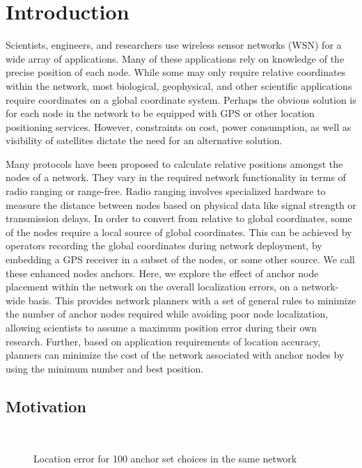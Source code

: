 
\chapter{Introduction}

Scientists, engineers, and researchers use wireless sensor networks (WSN) for a wide array of applications. Many of these applications rely on knowledge of the precise position of each node. While some may only require relative coordinates within the network, most biological, geophysical, and other scientific applications require coordinates on a global coordinate system. Perhaps the obvious solution is for each node in the network to be equipped with GPS or other location positioning services.  However, constraints on cost, power consumption, as well as visibility of satellites dictate the need for an alternative solution.  

Many protocols have been proposed\cite{APS,MDS-MAP,CCA-MAP07} to calculate relative positions amongst the nodes of a network.  They vary in the required network functionality in terms of radio ranging or range-free.  Radio ranging involves specialized hardware to measure the distance between nodes based on physical data like signal strength or transmission delays.  In order to convert from relative to global coordinates, some of the nodes require a local source of global coordinates.  This can be achieved by operators recording the global coordinates during network deployment, by embedding a GPS receiver in a subset of the nodes, or some other source.  We call these enhanced nodes anchors.  Here, we explore the effect of anchor node placement within the network on the overall localization errors, on a network-wide basis. This provides network planners with a set of general rules to minimize the number of anchor nodes required while avoiding poor node localization, allowing scientists to assume a maximum position error during their own research.  Further, based on application requirements of location accuracy, planners can minimize the cost of the network associated with anchor nodes by using the minimum number and best position.

\section{Motivation} 
\begin{figure}
  \centering
    \\
    \caption{Location error for 100 anchor set choices in the same network}
    \label{fig:Motivation}
\end{figure}

